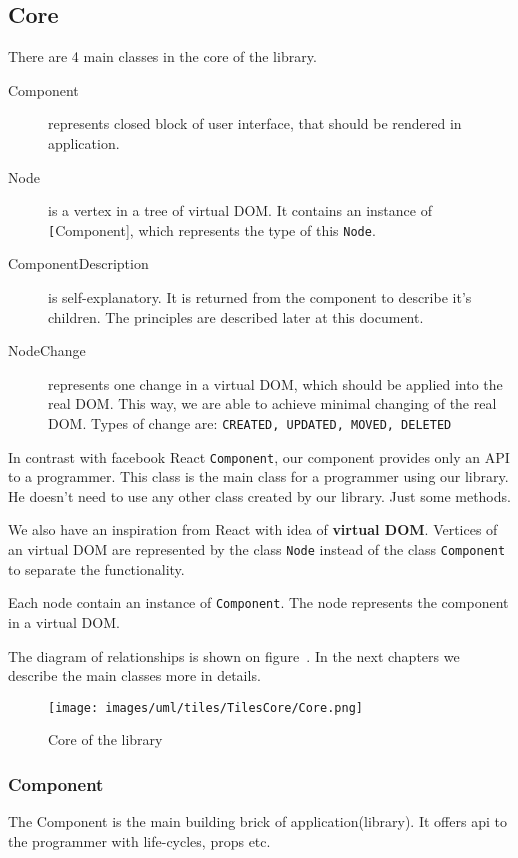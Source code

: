 \documentclass[oneside, 12pt]{book}
\begin{document}
  \subsection{Core}\label{subsec:our-architecture-core}
    There are 4 main classes in the core of the library.
    \begin{description}
      \item[Component] 
        represents closed block of user interface, 
        that should be rendered in application.
      \item[Node]
        is a vertex in a tree of virtual DOM. 
        It contains an instance of \texttt[Component], which represents the type of this \texttt{Node}.
      \item[ComponentDescription]
        is self-explanatory. 
        It is returned from the component to describe it's children. 
				The principles are described later at this document.
      \item[NodeChange]
        represents one change in a virtual DOM, which should be applied into the real DOM. 
        This way, we are able to achieve minimal changing of the real DOM. 
        Types of change are: \texttt{CREATED, UPDATED, MOVED, DELETED}
    \end{description}

    In contrast with facebook React \texttt{Component}, our component provides only an API to a programmer.
    This class is the main class for a programmer using our library. 
		He doesn't need to use any other class created by our library. 
    Just some methods.

    We also have an inspiration from React with idea of \textbf{virtual DOM}. 
		Vertices of an virtual DOM are represented by the class \texttt{Node} instead of the class \texttt{Component} to separate the functionality. 

    Each node contain an instance of \texttt{Component}. 
		The node represents the component in a virtual DOM.
    
    The diagram of relationships is shown on figure~. 
		In the next chapters we describe the main classes more in details.
    \begin{figure}[h]
    \centering  
      \texttt{[image: images/uml/tiles/TilesCore/Core.png]}
      \caption{Core of the library}
      \label{img:library-core}
    \end{figure}

    \subsubsection{Component}\label{subsubsec:our-architecture-core-component}
      The Component is the main building brick of application(library). 
      It offers api to the programmer with life-cycles, props etc. 
\end{document}
